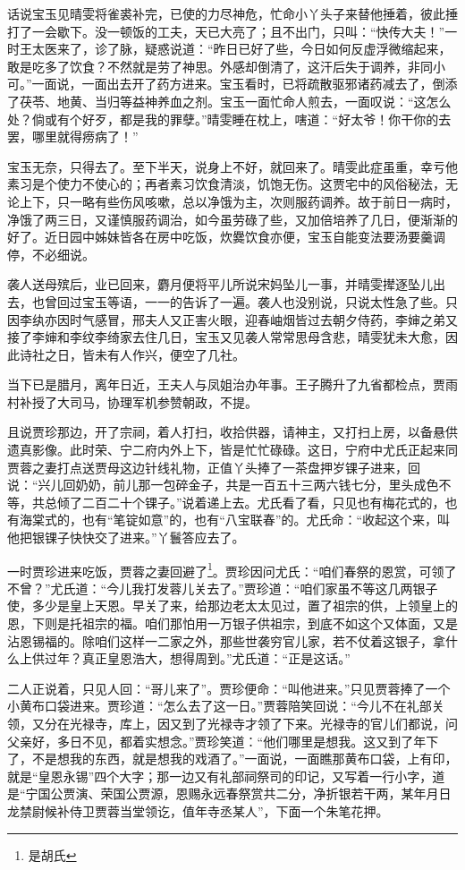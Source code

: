 \documentclass[12pt,oneside]{book}
\begin{document}
话说宝玉见晴雯将雀裘补完，已使的力尽神危，忙命小丫头子来替他捶着，彼此捶打了一会歇下。没一顿饭的工夫，天已大亮了；且不出门，只叫：“快传大夫！”一时王太医来了，诊了脉，疑惑说道：“昨日已好了些，今日如何反虚浮微缩起来，敢是吃多了饮食？不然就是劳了神思。外感却倒清了，这汗后失于调养，非同小可。”一面说，一面出去开了药方进来。宝玉看时，已将疏散驱邪诸药减去了，倒添了茯苓、地黄、当归等益神养血之剂。宝玉一面忙命人煎去，一面叹说：“这怎么处？倘或有个好歹，都是我的罪孽。”晴雯睡在枕上，嗐道：“好太爷！你干你的去罢，哪里就得痨病了！”

宝玉无奈，只得去了。至下半天，说身上不好，就回来了。晴雯此症虽重，幸亏他素习是个使力不使心的；再者素习饮食清淡，饥饱无伤。这贾宅中的风俗秘法，无论上下，只一略有些伤风咳嗽，总以净饿为主，次则服药调养。故于前日一病时，净饿了两三日，又谨慎服药调治，如今虽劳碌了些，又加倍培养了几日，便渐渐的好了。近日园中姊妹皆各在房中吃饭，炊爨饮食亦便，宝玉自能变法要汤要羹调停，不必细说。

袭人送母殡后，业已回来，麝月便将平儿所说宋妈坠儿一事，并晴雯撵逐坠儿出去，也曾回过宝玉等语，一一的告诉了一遍。袭人也没别说，只说太性急了些。只因李纨亦因时气感冒，邢夫人又正害火眼，迎春岫烟皆过去朝夕侍药，李婶之弟又接了李婶和李纹李绮家去住几日，宝玉又见袭人常常思母含悲，晴雯犹未大愈，因此诗社之日，皆未有人作兴，便空了几社。

当下已是腊月，离年日近，王夫人与凤姐治办年事。王子腾升了九省都检点，贾雨村补授了大司马，协理军机参赞朝政，不提。

且说贾珍那边，开了宗祠，着人打扫，收拾供器，请神主，又打扫上房，以备悬供遗真影像。此时荣、宁二府内外上下，皆是忙忙碌碌。这日，宁府中尤氏正起来同贾蓉之妻打点送贾母这边针线礼物，正值丫头捧了一茶盘押岁锞子进来，回说：“兴儿回奶奶，前儿那一包碎金子，共是一百五十三两六钱七分，里头成色不等，共总倾了二百二十个锞子。”说着递上去。尤氏看了看，只见也有梅花式的，也有海棠式的，也有“笔锭如意”的，也有“八宝联春”的。尤氏命：“收起这个来，叫他把银锞子快快交了进来。”丫鬟答应去了。

一时贾珍进来吃饭，贾蓉之妻回避了\footnote{是胡氏}。贾珍因问尤氏：“咱们春祭的恩赏，可领了不曾？”尤氏道：“今儿我打发蓉儿关去了。”贾珍道：“咱们家虽不等这几两银子使，多少是皇上天恩。早关了来，给那边老太太见过，置了祖宗的供，上领皇上的恩，下则是托祖宗的福。咱们那怕用一万银子供祖宗，到底不如这个又体面，又是沾恩锡福的。除咱们这样一二家之外，那些世袭穷官儿家，若不仗着这银子，拿什么上供过年？真正皇恩浩大，想得周到。”尤氏道：“正是这话。”

二人正说着，只见人回：“哥儿来了”。贾珍便命：“叫他进来。”只见贾蓉捧了一个小黄布口袋进来。贾珍道：“怎么去了这一日。”贾蓉陪笑回说：“今儿不在礼部关领，又分在光禄寺，库上，因又到了光禄寺才领了下来。光禄寺的官儿们都说，问父亲好，多日不见，都着实想念。”贾珍笑道：“他们哪里是想我。这又到了年下了，不是想我的东西，就是想我的戏酒了。”一面说，一面瞧那黄布口袋，上有印，就是“皇恩永锡”四个大字；那一边又有礼部祠祭司的印记，又写着一行小字，道是“宁国公贾演、荣国公贾源，恩赐永远春祭赏共二分，净折银若干两，某年月日龙禁尉候补侍卫贾蓉当堂领讫，值年寺丞某人”，下面一个朱笔花押。
\end{document}
